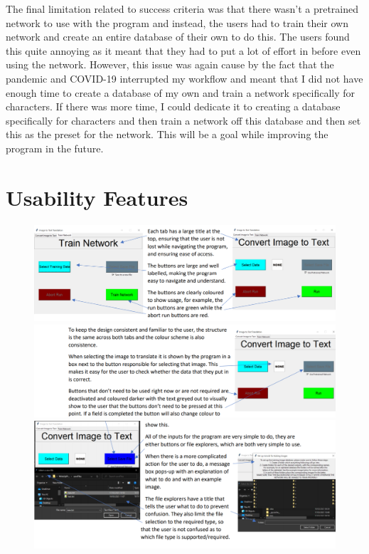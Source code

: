 \documentclass{report}
\begin{document}
\newline
\newline
The final limitation related to success criteria was that there wasn't a pretrained network to use with the program and instead, the users had to train their own network and create an entire database of their own to do this. The users found this quite annoying as it meant that they had to put a lot of effort in before even using the network. However, this issue was again cause by the fact that the pandemic and COVID-19 interrupted my workflow and meant that I did not have enough time to create a database of my own and train a network specifically for characters. If there was more time, I could dedicate it to creating a database specifically for characters and then train a network off this database and then set this as the preset for the network. This will be a goal while improving the program in the future.

\newpage
\section{Usability Features}
\begin{figure}[h]
    \centering
    \includegraphics[width=5.5in]{Images/Evaluation/Usability Features/Usability Features 1.png}
    \includegraphics[width=5.5in]{Images/Evaluation/Usability Features/Usability Features 2.png}
    \includegraphics[width=5.5in]{Images/Evaluation/Usability Features/Usability Features 3.png}
\end{figure}
\newpage
\end{document}
